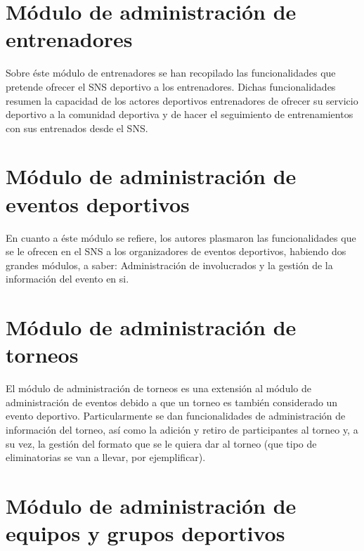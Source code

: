 \section{Módulo de administración de entrenadores}

%

Sobre éste módulo de entrenadores se han recopilado las funcionalidades que pretende ofrecer el SNS deportivo a los entrenadores. Dichas funcionalidades resumen la capacidad de los actores deportivos entrenadores de ofrecer su servicio deportivo a la comunidad deportiva y de hacer el seguimiento de entrenamientos con sus entrenados desde el SNS.



\section{Módulo de administración de eventos deportivos}

%

En cuanto a éste módulo se refiere, los autores plasmaron las funcionalidades que se le ofrecen en el SNS a los organizadores de eventos deportivos, habiendo dos grandes módulos, a saber: Administración de involucrados y la gestión de la información del evento en si.



\section{Módulo de administración de torneos}

%

El módulo de administración de torneos es una extensión al módulo de administración de eventos debido a que un torneo es también considerado un evento deportivo. Particularmente se dan funcionalidades de administración de información del torneo, así como la adición y retiro de participantes al torneo y, a su vez, la gestión del formato que se le quiera dar al torneo (que tipo de eliminatorias se van a llevar, por ejemplificar).



\section{Módulo de administración de equipos y grupos deportivos}

